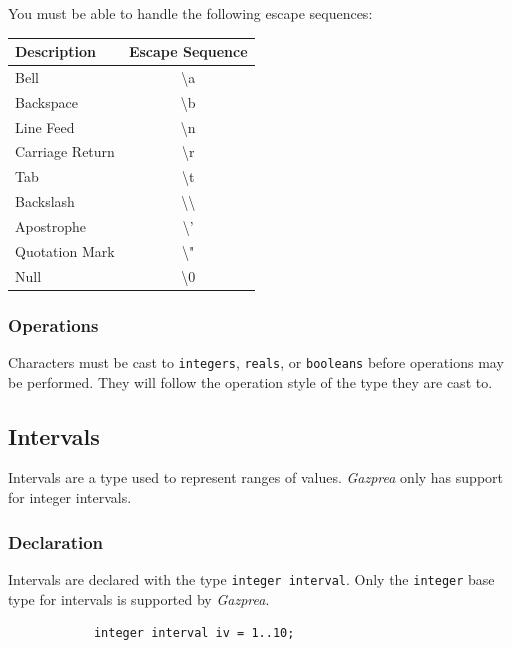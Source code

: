 \documentclass{article}
\begin{document}
		You must be able to handle the following escape sequences:

		\begin{center}
			\begin{tabular}{|l|c|}
				\hline
				\textbf{Description} & \textbf{Escape Sequence} \\
				\hline
				Bell            & \textbackslash{}a \\
				Backspace       & \textbackslash{}b \\
				Line Feed       & \textbackslash{}n \\
				Carriage Return & \textbackslash{}r \\
				Tab             & \textbackslash{}t \\
				Backslash       & \textbackslash{}\textbackslash{} \\
				Apostrophe      & \textbackslash{}' \\
				Quotation Mark  & \textbackslash{}" \\
				Null            & \textbackslash0   \\
				\hline
			\end{tabular}
		\end{center}

	\subsubsection{Operations}

		Characters must be cast to \texttt{integers}, \texttt{reals}, or \texttt{booleans} before operations may be
		performed. They will follow the operation style of the type they are cast to.


	\subsection{Intervals}\label{sec:interval}
		Intervals are a type used to represent ranges of values.
 		\textit{Gazprea} only has support for integer intervals.

	\subsubsection{Declaration}

		Intervals are declared with the type \texttt{integer interval}. Only the \texttt{integer} base type for
		intervals is supported by \textit{Gazprea}.

		\begin{lstlisting}
			integer interval iv = 1..10;
		\end{lstlisting}
\end{document}
